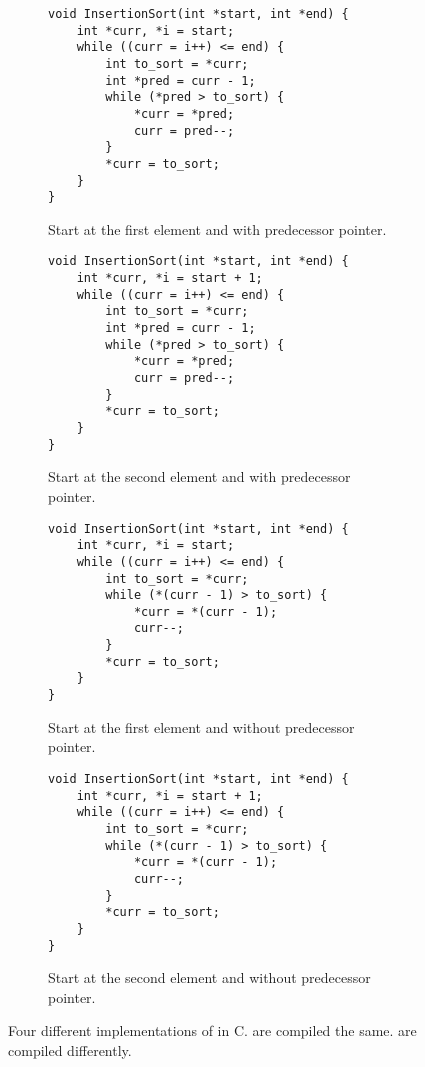 \begin{figure}
	\lstset{basicstyle=\ttfamily\small}
	\def\iscodewidth{0.47\linewidth}
	\begin{subfigure}{\iscodewidth}
		\begin{lstlisting}
void InsertionSort(int *start, int *end) {
	int *curr, *i = start;
	while ((curr = i++) <= end) {
		int to_sort = *curr;
		int *pred = curr - 1;
		while (*pred > to_sort) {
			*curr = *pred;
			curr = pred--;
		}
		*curr = to_sort;
	}
}
		\end{lstlisting}
		\caption{
			Start at the first element and with predecessor pointer.
		}
		\label{fig:insertion:impl:pred_first}
	\end{subfigure}
	\hfill
	\begin{subfigure}{\iscodewidth}
		\begin{lstlisting}
void InsertionSort(int *start, int *end) {
	int *curr, *i = start + 1;
	while ((curr = i++) <= end) {
		int to_sort = *curr;
		int *pred = curr - 1;
		while (*pred > to_sort) {
			*curr = *pred;
			curr = pred--;
		}
		*curr = to_sort;
	}
}
		\end{lstlisting}
		\caption{
			Start at the second element and with predecessor pointer.
		}
		\label{fig:insertion:impl:pred_sec}
	\end{subfigure}

	\begin{subfigure}{\iscodewidth}
		\begin{lstlisting}
void InsertionSort(int *start, int *end) {
	int *curr, *i = start;
	while ((curr = i++) <= end) {
		int to_sort = *curr;
		while (*(curr - 1) > to_sort) {
			*curr = *(curr - 1);
			curr--;
		}
		*curr = to_sort;
	}
}
		\end{lstlisting}
		\caption{
			Start at the first element and without predecessor pointer.
		}
		\label{fig:insertion:impl:offset_first}
	\end{subfigure}
	\hfill
	\begin{subfigure}{\iscodewidth}
		\begin{lstlisting}
void InsertionSort(int *start, int *end) {
	int *curr, *i = start + 1;
	while ((curr = i++) <= end) {
		int to_sort = *curr;
		while (*(curr - 1) > to_sort) {
			*curr = *(curr - 1);
			curr--;
		}
		*curr = to_sort;
	}
}
		\end{lstlisting}
		\caption{
			Start at the second element and without predecessor pointer.
		}
		\label{fig:insertion:impl:offset_sec}
	\end{subfigure}
	\caption{
		Four different implementations of \IS{} in C.
		 are compiled the same.
		 are compiled differently.
	}
\end{figure}

